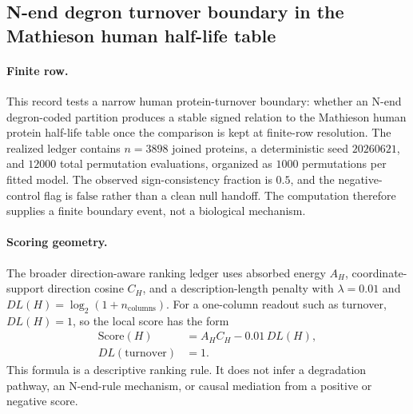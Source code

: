 \subsection{N-end degron turnover boundary in the Mathieson human half-life table}\label{subsec:bioreality-nend-degron-turnover-boundary-mathieson}

\paragraph{Finite row.}
This record tests a narrow human protein-turnover boundary: whether an N-end degron-coded partition produces a stable signed relation to the Mathieson human protein half-life table once the comparison is kept at finite-row resolution. The realized ledger contains $n=3898$ joined proteins, a deterministic seed $20260621$, and $12000$ total permutation evaluations, organized as $1000$ permutations per fitted model. The observed sign-consistency fraction is $0.5$, and the negative-control flag is $\mathrm{false}$ rather than a clean null handoff. The computation therefore supplies a finite boundary event, not a biological mechanism.

\paragraph{Scoring geometry.}
The broader direction-aware ranking ledger uses absorbed energy $A_H$, coordinate-support direction cosine $C_H$, and a description-length penalty with $\lambda=0.01$ and $DL(H)=\log_2(1+n_{\mathrm{columns}})$. For a one-column readout such as turnover, $DL(H)=1$, so the local score has the form
$$
\begin{aligned}
\mathrm{Score}(H) &= A_H C_H - 0.01\,DL(H),\\
DL(\mathrm{turnover}) &= 1.
\end{aligned}
$$
This formula is a descriptive ranking rule. It does not infer a degradation pathway, an N-end-rule mechanism, or causal mediation from a positive or negative score.

